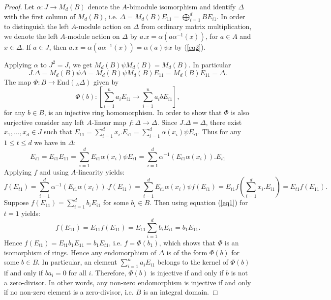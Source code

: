 \documentclass[oneside, a4paper, 11pt]{amsart}
\begin{document}
\begin{proof}
Let $\alpha: J\rightarrow M_d(B)$ denote the $A$-bimodule isomorphism and identify $\Delta$ with the first column of 
$M_d(B)$, i.e. $\Delta = M_d(B)E_{11} = \bigoplus_{i=1}^d BE_{i1}$.  In order to distinguish the left $A$-module action 
on $\Delta$ from ordinary matrix multiplication, we denote the left $A$-module action on $\Delta$ by $a.x = 
\alpha(a\alpha^{-1}(x))$, for $a\in A$ and $x\in \Delta$. If $a\in J$, then $ a.x = \alpha(a\alpha^{-1}(x)) = \alpha(a) 
\psi x$ by (\ref{eq2}).


Applying $\alpha$ to  $J^2=J$, we get $M_d(B)\psi M_d(B) = M_d(B)$. In particular $$J.\Delta = M_d(B)\psi \Delta = 
M_d(B)\psi M_d(B)E_{11} = M_d(B)E_{11} = \Delta.$$
The map $\Phi: B\rightarrow \mathrm{End}(_A\Delta)$ given by 
$$\Phi(b) : \left[ \sum_{i=1}^n a_iE_{i1}\rightarrow \sum_{i=1}^n a_ibE_{i1}\right],$$ for any $b\in B$, is an 
injective  ring homomorphism. In order to show that $\Phi$ is also surjective consider any left $A$-linear map $f:\Delta 
\rightarrow \Delta$.  Since $J.\Delta=\Delta$, there exist $x_1, \ldots, x_d \in J$ such that  $E_{11} = \sum_{i=1}^d 
x_i . E_{i1} = \sum_{i=1}^d \alpha(x_i) \psi E_{i1} .$
Thus for any $1\leq t\leq d$ we have in $\Delta$: 
$$E_{t1} = E_{t1}E_{11} 
=  \sum_{i=1}^d E_{t1}\alpha(x_i) \psi E_{i1}  
=  \sum_{i=1}^d \alpha^{-1}(E_{t1} \alpha(x_i)) . E_{i1} $$
Applying $f$ and using $A$-linearity yields:
\begin{equation}\label{eq1}f(E_{t1}) 
= \sum_{i=1}^d \alpha^{-1}(E_{t1} \alpha(x_i)) . f\left(E_{i1}\right)
= \sum_{i=1}^d E_{t1} \alpha(x_i) \psi f\left(E_{i1}\right)
= E_{t1}  f\left( \sum_{i=1}^d x_i .E_{i1}\right) = E_{t1} f(E_{11}).
\end{equation}
Suppose $f(E_{11})=\sum_{i=1}^d b_i E_{i1}$ for some $b_i \in B$. Then using equation (\ref{eq1}) for $t=1$ yields:
$$ f(E_{11})=E_{11}f(E_{11})=E_{11} \sum_{i=1}^d b_i E_{i1} = b_1 E_{11}.$$
Hence $f(E_{t1})=E_{t1}b_1 E_{11} = b_1 E_{t1}$, i.e. $f = \Phi(b_1)$, which shows that  $\Phi$ is an 
isomorphism of rings. Hence any endomorphism of $\Delta$ is of the form $\Phi(b)$ for some $b\in B$. In particular, an element $\sum_{i=1}^n a_i E_{i1}$ belongs to the kernel of $\Phi(b)$ if and only if $ba_i=0$ for all $i$. Therefore, $\Phi(b)$ is injective if and only if $b$ is not a zero-divisor. In other words, any non-zero endomorphism is injective if and only if no non-zero element is a zero-divisor, i.e. $B$ is an integral domain.
\end{proof}
\end{document}
